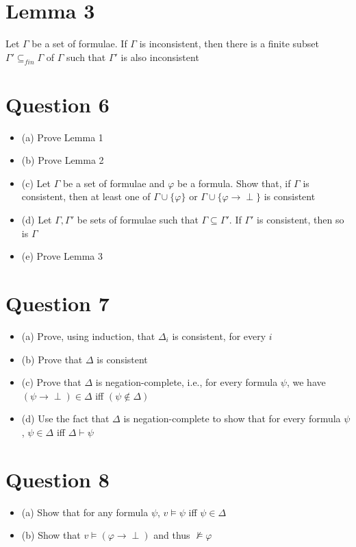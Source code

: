 \documentclass{article}
\begin{document}
\section*{Lemma 3}
Let $\Gamma$ be a set of formulae. If $\Gamma$ is inconsistent, then there is a finite subset $\Gamma' \subseteq_{fin} \Gamma$ of $\Gamma$ such that $\Gamma'$ is also inconsistent

\section*{Question 6}
\begin{itemize}
    \item (a) Prove Lemma 1
    \item (b) Prove Lemma 2
    \item (c) Let $\Gamma$ be a set of formulae and $\varphi$ be a formula. Show that, if $\Gamma$ is consistent, then at least one of $\Gamma \cup \{\varphi\}$ or $\Gamma \cup \{\varphi \rightarrow \perp\}$ is consistent
    \item (d) Let $\Gamma, \Gamma'$ be sets of formulae such that $\Gamma \subseteq \Gamma'$. If $\Gamma'$ is consistent, then so is $\Gamma$
    \item (e) Prove Lemma 3
\end{itemize}

\section*{Question 7}
\begin{itemize}
    \item (a) Prove, using induction, that $\Delta_i$ is consistent, for every $i$
    \item (b) Prove that $\Delta$ is consistent
    \item (c) Prove that $\Delta$ is negation-complete, i.e., for every formula $\psi$, we have $(\psi \rightarrow \perp) \in \Delta$ iff $(\psi \notin \Delta)$
    \item (d) Use the fact that $\Delta$ is negation-complete to show that for every formula $\psi$, $\psi \in \Delta$ iff $\Delta \vdash \psi$
\end{itemize}

\section*{Question 8}
\begin{itemize}
    \item (a) Show that for any formula $\psi$, $v \models \psi$ iff $\psi \in \Delta$
    \item (b) Show that $v \models (\varphi \rightarrow \perp)$ and thus $\not\models \varphi$
\end{itemize}
\end{document}
